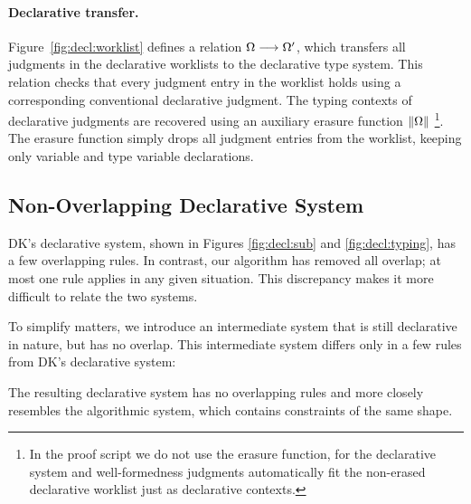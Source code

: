 \paragraph{Declarative transfer.}
Figure~\ref{fig:decl:worklist} defines a relation $\Omega \longrightarrow \Omega'$,
which transfers all judgments in the declarative worklists to the
declarative type system. This relation checks that every judgment entry in the worklist
holds using a corresponding conventional declarative judgment. 
The typing contexts of declarative judgments are recovered using an
auxiliary erasure function $\|\Omega\|$
\footnote{In the proof script we do not use the erasure function,
for the declarative system and well-formedness judgments automatically fit
the non-erased declarative worklist just as declarative contexts.}.
The erasure function simply drops all judgment entries from the worklist,
keeping only variable and type variable declarations.

\subsection{Non-Overlapping Declarative System}
\label{sec:metatheory:non-overlapping}

DK's declarative system, shown in Figures \ref{fig:decl:sub} and
\ref{fig:decl:typing}, has a few overlapping rules. In contrast, our algorithm
has removed all overlap; at most one rule applies in any given situation.
This discrepancy makes it more difficult to relate the two systems.

To simplify matters, we introduce an intermediate system that is still declarative
in nature, but has no overlap. This intermediate system differs only in a few 
rules from DK's declarative system:
The resulting declarative system has no overlapping rules
and more closely resembles the algorithmic system,
which contains constraints of the same shape.

